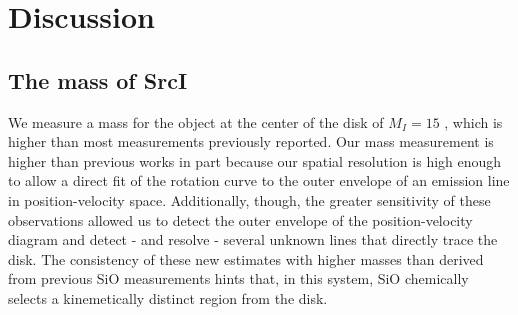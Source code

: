 \documentclass[twocolumn]{aastex61}
\newcommand{\sourcei}{SrcI\xspace}
\begin{document}
% 
% 


\section{Discussion}
\label{sec:discussion}
\subsection{The mass of \sourcei}
We measure a mass for the object at the center of the disk of $M_I=15$
\msun, which is higher than most measurements previously reported.  Our mass
measurement is higher than previous works in part because our spatial
resolution is high enough to allow a direct fit of the rotation curve to the
outer envelope of an emission line in position-velocity space.
Additionally, though, the greater sensitivity of these observations allowed
us to detect the outer envelope of the \water position-velocity diagram
and detect - and resolve - several unknown lines that directly trace the disk.
The consistency of these new estimates with higher masses than derived from
previous SiO measurements hints that, in this system, SiO chemically selects a
kinemetically distinct region from the disk.
\end{document}
